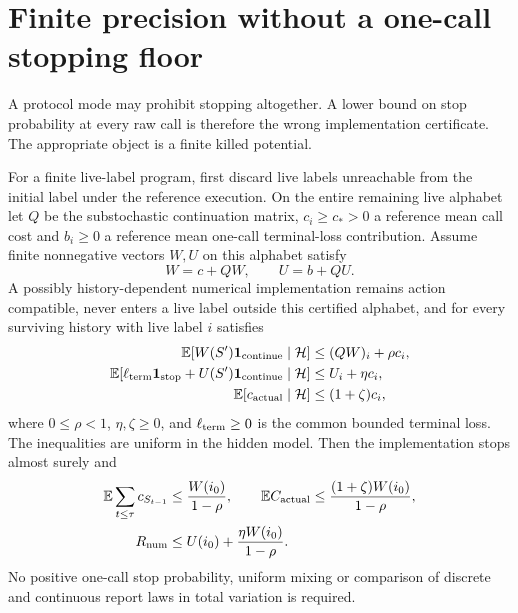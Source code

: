 \section{Finite precision without a one-call stopping floor}
\label{sec:perturbation}
A protocol mode may prohibit stopping altogether. A lower bound on stop probability at every raw call is therefore the wrong implementation certificate. The appropriate object is a finite killed potential.

\begin{theorem}\label{thm:perturbation}
For a finite live-label program, first discard live labels unreachable from the initial label under the reference execution. On the entire remaining live alphabet let $Q$ be the substochastic continuation matrix, $c_i\ge c_*>0$ a reference mean call cost and $b_i\ge0$ a reference mean one-call terminal-loss contribution. Assume finite nonnegative vectors $W,U$ on this alphabet satisfy
\begin{equation}\label{eq:potentials}
 W=c+QW,\qquad U=b+QU.
\end{equation}
A possibly history-dependent numerical implementation remains action compatible, never enters a live label outside this certified alphabet, and for every surviving history with live label $i$ satisfies
\begin{align}
 \mathbb E[W(S')\mathbf1_{\rm continue}\mid\mathcal H]&\le (QW)_i+\rho c_i,\label{eq:driftW}\\
 \mathbb E[\ell_{\rm term}\mathbf1_{\rm stop}+U(S')\mathbf1_{\rm continue}\mid\mathcal H]
   &\le U_i+\eta c_i,\label{eq:driftU}\\
 \mathbb E[c_{\rm actual}\mid\mathcal H]&\le(1+\zeta)c_i,\label{eq:driftC}
\end{align}
where $0\le\rho<1$, $\eta,\zeta\ge0$, and $\ell_{\rm term}\ge0$ is the common bounded terminal loss. The inequalities are uniform in the hidden model. Then the implementation stops almost surely and
\begin{align}
 \mathbb E\sum_{t\le\tau}c_{S_{t-1}}&\le\frac{W(i_0)}{1-\rho},\qquad
 \mathbb E C_{\rm actual}\le\frac{(1+\zeta)W(i_0)}{1-\rho},\label{eq:cost-stability}\\
 R_{\rm num}&\le U(i_0)+\frac{\eta W(i_0)}{1-\rho}.\label{eq:risk-stability}
\end{align}
No positive one-call stop probability, uniform mixing or comparison of discrete and continuous report laws in total variation is required.
\end{theorem}
